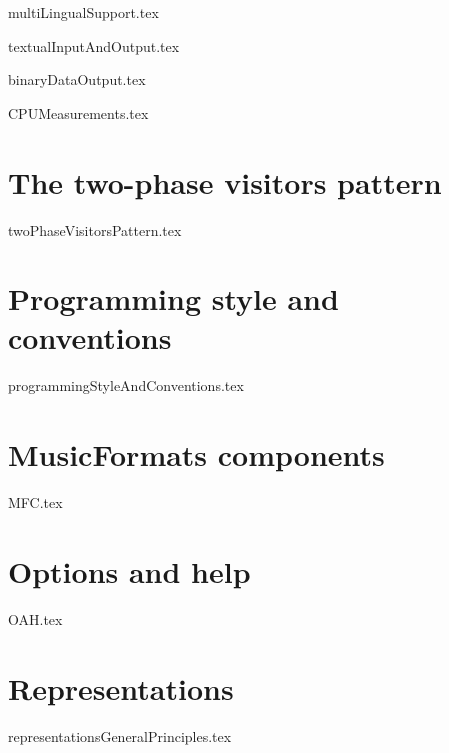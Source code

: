 \documentclass[11pt,a4paper]{report}
\begin{document}
{multiLingualSupport.tex}

{textualInputAndOutput.tex}

{binaryDataOutput.tex}

{CPUMeasurements.tex}


\part{The two-phase visitors pattern}

{twoPhaseVisitorsPattern.tex}


\part{Programming style and conventions}

{programmingStyleAndConventions.tex}


\part{MusicFormats components}

{MFC.tex}


\part{Options and help}

{OAH.tex}


\part{Representations}

{representationsGeneralPrinciples.tex}
\end{document}
